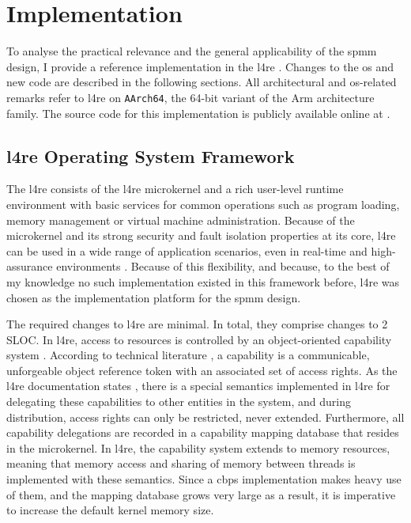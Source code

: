 \chapter{Implementation}
\label{chap:implementation}

To analyse the practical relevance and the general applicability of the \ac{spmm} design, I provide a reference implementation in the \acl{l4re} \cite{l4re}.
Changes to the \ac{os} and new code are described in the following sections.
All architectural and \ac{os}-related remarks refer to \ac{l4re} on \texttt{AArch64}, the 64-bit variant of the Arm architecture family.
The source code for this implementation is publicly available online at \cite{l4re-spm}.

\section{\acs{l4re} Operating System Framework}
\label{sec:l4re-os}

The \acl{l4re} consists of the \acs{l4re} microkernel and a rich user-level runtime environment with basic services for common operations such as program loading, memory management or virtual machine administration.
Because of the microkernel and its strong security and fault isolation properties at its core, \ac{l4re} can be used in a wide range of application scenarios, even in real-time and high-assurance environments \cite{l4re-industries}.
Because of this flexibility, and because, to the best of my knowledge no such implementation existed in this framework before, \ac{l4re} was chosen as the implementation platform for the \ac{spmm} design.

The required changes to \ac{l4re} are minimal.
In total, they comprise changes to 2 SLOC.
In \ac{l4re}, access to resources is controlled by an object-oriented capability system \cite{l4re-capabilities}.
According to technical literature \cite{capability1999}, a capability is a communicable, unforgeable object reference token with an associated set of access rights.
As the \ac{l4re} documentation states \cite{l4re-capabilities}, there is a special semantics implemented in \ac{l4re} for delegating these capabilities to other entities in the system, and during distribution, access rights can only be restricted, never extended.
Furthermore, all capability delegations are recorded in a capability mapping database that resides in the microkernel.
In \ac{l4re}, the capability system extends to memory resources, meaning that memory access and sharing of memory between threads is implemented with these semantics.
Since a \ac{cbps} implementation makes heavy use of them, and the mapping database grows very large as a result, it is imperative to increase the default kernel memory size.

